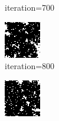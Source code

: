 \documentclass{article}
\begin{document}
\begin{figure}[h]
\begin{subfigure}[t]{0.18\textwidth}
\vspace{-0.6cm}
\caption{iteration=700}
\end{subfigure}\hspace{0.01\textwidth}
\begin{subfigure}[t]{0.18\textwidth}
\centering
\includegraphics[width=\textwidth]{./computational/results/gibbs_node_sampler_negative_iter_800.png}
\vspace{-0.6cm}
\caption{iteration=800}
\end{subfigure}\hspace{0.01\textwidth}
\begin{subfigure}[t]{0.18\textwidth}
\centering
\includegraphics[width=\textwidth]{./computational/results/gibbs_node_sampler_negative_iter_900.png}

\end{subfigure}
\end{figure}
\end{document}
